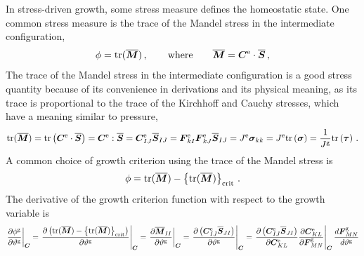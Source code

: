 \documentclass[10pt,letterpaper,oneside]{report}
\newcommand{\ten}[1]{\mbox{\boldmath $#1$}{}}
\newcommand{\scas}[1]{\mbox{{\scriptsize{${\rm{#1}}$}}}{}}
\newcommand{\tens}[1]{\mbox{\boldmath{\scriptsize{$#1$}}}{}}
\begin{document}
In stress-driven growth, some stress measure defines the homeostatic state.  One common stress measure is the trace of the Mandel stress in the intermediate configuration, 
\begin{equation}
\phi = \text{tr} ( \overline{\ten{M}} ) \, , 
\qquad \text{where} \qquad
\overline{\ten{M}} = \ten{C}^{\scas{e}} \cdot \overline{\ten{S}} \, ,
\label{def_Mandel}
\end{equation}
The trace of the Mandel stress in the intermediate configuration is a good stress quantity because of its convenience in derivations and its physical meaning, as its trace is proportional to the trace of the Kirchhoff and Cauchy stresses, which have a meaning similar to pressure, 
\begin{equation}
\text{tr} (\overline{\ten{M}} ) = \text{tr} \left( \ten{C}^{\scas{e}} \cdot \overline{\ten{S}} \right) =  \ten{C}^{\scas{e}} : \overline{\ten{S}} =  \ten{C}^{\scas{e}}_{IJ} \overline{\ten{S}}_{IJ} = \ten{F}^{\scas{e}}_{kI} \ten{F}^{\scas{e}}_{kJ} \overline{\ten{S}}_{IJ} = J^{\scas{e}} \ten{\sigma}_{kk} = J^{\scas{e}} \text{tr} \left( \ten{\sigma} \right) 
= \frac{1}{J^{\scas{g}}} \text{tr} \left( \ten{\tau} \right) \, . 
\end{equation}
A common choice of growth criterion using the trace of the Mandel stress is 
\begin{equation}
\phi = \text{tr} ( \overline{\ten{M}} ) - \left\lbrace \text{tr} ( \overline{\ten{M}} ) \right\rbrace_{\scas{crit}} \, . 
\label{growth_criterion_Mandel}
\end{equation}
The derivative of the growth criterion function with respect to the growth variable is  
\begin{equation}
\left. \frac{\partial \phi^{\scas{g}}}{\partial \vartheta^{\scas{g}}} \right|_{\tens{C}}
= \left. \frac{\partial \left( \text{tr} (\overline{\ten{M}}) - \left\lbrace \text{tr} (\overline{\ten{M}} )\right\rbrace_{\scas{crit}} \right)}{\partial \vartheta^{\scas{g}}} \right|_{\tens{C}}
= \left. \frac{\partial \overline{\ten{M}}_{II} }{\partial \vartheta^{\scas{g}}} \right|_{\tens{C}} 
= \left. \frac{ \partial \left( \ten{C}^{\scas{e}}_{IJ} \overline{\ten{S}}_{JI} \right)}{\partial \vartheta^{\scas{g}}} \right|_{\tens{C}} 
= \left. \frac{ \partial \left( \ten{C}^{\scas{e}}_{IJ} \overline{\ten{S}}_{JI} \right)}{\partial \ten{C}^{\scas{e}}_{KL} } \frac{ \partial \ten{C}^{\scas{e}}_{KL} }{ \partial \ten{F}^{\scas{g}}_{MN} } \right|_{\tens{C}} \frac{ d \ten{F}^{\scas{g}}_{MN} }{ d \vartheta^{\scas{g}} }
\end{equation}
\end{document}
